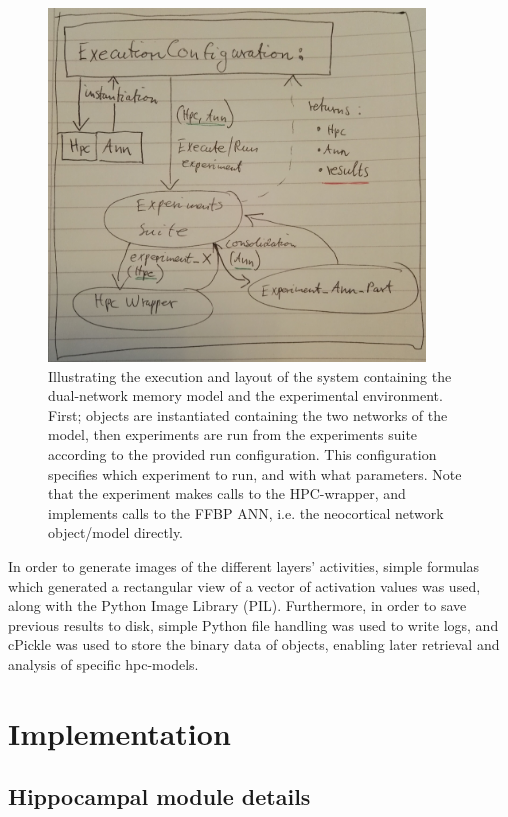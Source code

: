 \begin{figure}
    \centering
    \includegraphics[width=10cm]{fig/ExecutionConfiguration.png}
    \caption{Illustrating the execution and layout of the system containing the dual-network memory model and the experimental environment. First; objects are instantiated containing the two networks of the model, then experiments are run from the experiments suite according to the provided run configuration. This configuration specifies which experiment to run, and with what parameters. Note that the experiment makes calls to the HPC-wrapper, and implements calls to the FFBP ANN, i.e. the neocortical network object/model directly.}
    \label{fig:system_layout}
\end{figure}

In order to generate images of the different layers' activities, simple formulas which generated a rectangular view of a vector of activation values was used, along with the Python Image Library (PIL). Furthermore, in order to save previous results to disk, simple Python file handling was used to write logs, and cPickle was used to store the binary data of objects, enabling later retrieval and analysis of specific hpc-models.

\section{Implementation}

\subsection{Hippocampal module details}

